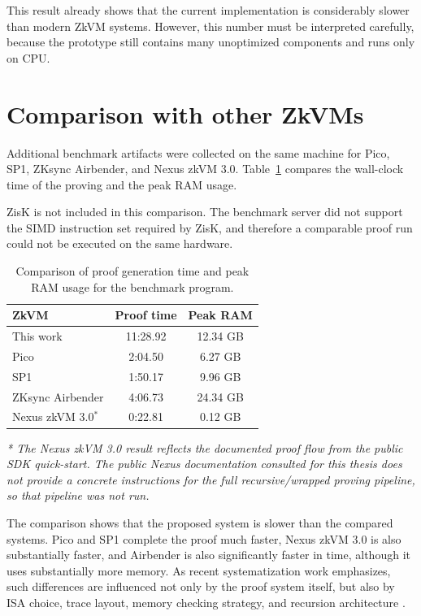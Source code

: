 This result already shows that the current implementation is considerably slower
than modern ZkVM systems. However, this number must be interpreted carefully,
because the prototype still contains many unoptimized components and runs only
on CPU.

\section{Comparison with other ZkVMs}

Additional benchmark artifacts were collected on the same machine for Pico,
SP1, ZKsync Airbender, and Nexus zkVM 3.0. Table~\ref{tab:zkvm-benchmarks-v2}
compares the wall-clock time of the proving and the peak RAM usage.

ZisK is not included in this comparison. The benchmark server did not support
the SIMD instruction set required by ZisK, and therefore a comparable proof run
could not be executed on the same hardware.

\begin{table}[h]
	\centering
	\begin{tabular}{|l|c|c|}
		\hline
		\textbf{ZkVM}        & \textbf{Proof time} & \textbf{Peak RAM} \\
		\hline
		This work            & 11:28.92            & 12.34 GB          \\
		Pico                 & 2:04.50             & 6.27 GB           \\
		SP1                  & 1:50.17             & 9.96 GB           \\
		ZKsync Airbender     & 4:06.73             & 24.34 GB          \\
		Nexus zkVM 3.0$^{*}$ & 0:22.81             & 0.12 GB           \\
		\hline
	\end{tabular}
	\caption{Comparison of proof generation time and peak RAM usage for the benchmark program.}
	\label{tab:zkvm-benchmarks-v2}
\end{table}

\noindent\textit{* The Nexus zkVM 3.0 result reflects the documented
	proof flow from the public SDK quick-start. The public
	Nexus documentation consulted for this thesis does not provide a concrete
	instructions for the full recursive/wrapped proving pipeline, so that pipeline was
	not run.}

The comparison shows that the proposed system is slower than the compared
systems. Pico and SP1 complete the proof much faster, Nexus zkVM 3.0 is also
substantially faster, and Airbender is also significantly faster in time,
although it uses substantially more memory.
As recent systematization work emphasizes, such differences are influenced not
only by the proof system itself, but also by ISA choice, trace layout, memory
checking strategy, and recursion architecture \cite{SoKZkVMs}.

